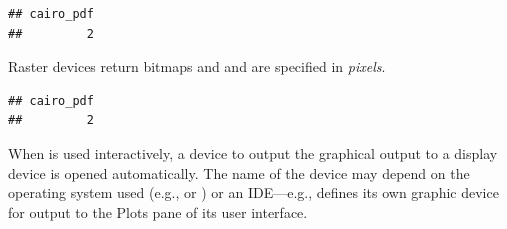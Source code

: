 \documentclass[krantz2]{krantz}\usepackage{knitr}
\begin{document}
\begin{knitrout}\footnotesize
{}\color{fgcolor}\begin{kframe}
\begin{alltt}
\hlstd{(} \hlstd{=} \hlstd{,}  \hlstd{=} \hlstd{,}  \hlstd{=} \hlstd{,}  \hlstd{=} \hlstd{)}
 \hlopt{~}   
 \hlopt{~}   
\hlstd{()}
\end{alltt}
\begin{verbatim}
## cairo_pdf
##         2
\end{verbatim}
\end{kframe}
\end{knitrout}

Raster devices return bitmaps and  and  are specified in \emph{pixels}.

\begin{knitrout}\footnotesize
{}\color{fgcolor}\begin{kframe}
\begin{alltt}
\hlstd{(} \hlstd{=} \hlstd{,}  \hlstd{=} \hlstd{,}  \hlstd{=} \hlstd{)}
 \hlopt{~}   
\hlstd{()}
\end{alltt}
\begin{verbatim}
## cairo_pdf
##         2
\end{verbatim}
\end{kframe}
\end{knitrout}

When \Rlang is used interactively, a device to output the graphical output to a display device is opened automatically. The name of the device may depend on the operating system used (e.g.,   or ) or an IDE---e.g.,  \RStudio defines its own graphic device for output to the Plots pane of its user interface.
\end{document}
